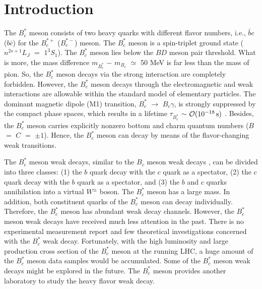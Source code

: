 \documentclass[preprint,superscriptaddress,nofootinbib]{revtex4}
\begin{document}
  \section{Introduction}
  \label{sec01}
  The $B_{c}^{\ast}$ meson consists of two heavy quarks with
  different flavor numbers, i.e., $\bar{b}c$ ($b\bar{c}$) for the
  $B_{c}^{{\ast}+}$ ($B_{c}^{{\ast}-}$) meson.
  The $B_{c}^{\ast}$ meson is a spin-triplet ground state
  ($n^{2s+1}L_{J}$ $=$ $1^{3}S_{1}$).
  The $B_{c}^{\ast}$ meson lies below the $BD$ meson pair
  threshold. What is more, the mass difference $m_{B_{c}^{\ast}}$ $-$
  $m_{B_{c}}$ ${\simeq}$ 50 MeV \cite{prd86.094510} is far less
  than the mass of pion.
  So, the $B_{c}^{\ast}$ meson decays via the strong interaction are
  completely forbidden.
  However, the $B_{c}^{\ast}$ meson decays through the
  electromagnetic and weak interactions are allowable within the
  standard model of elementary particles.
  The dominant magnetic dipole (M1) transition,
  $B_{c}^{\ast}$ ${\to}$ $B_{c}{\gamma}$, is strongly suppressed by
  the compact phase spaces, which results in a lifetime
  ${\tau}_{B_{c}^{\ast}}$ ${\sim}$ ${\cal O}(10^{-18}\,{\rm s})$
  \cite{epja52.90}.
  Besides, the $B_{c}^{\ast}$ meson carries explicitly nonzero
  bottom and charm quantum numbers ($B$ $=$ $C$ $=$ ${\pm}1$).
  Hence, the $B_{c}^{\ast}$ meson can decay by means of the
  flavor-changing weak transitions.

  The $B_{c}^{\ast}$ meson weak decays, similar to the $B_{c}$
  meson weak decays \cite{qwg,zpc51,prd49,usp38,epjc60.107,prd77.074013,prd89.114019},
  can be divided into three classes:
  (1) the $b$ quark decay with the $c$ quark as a spectator,
  (2) the $c$ quark decay with the $b$ quark as a spectator,
  and (3) the $b$ and $c$ quarks annihilation into a virtual
  $W^{\pm}$ boson.
  The $B_{c}^{\ast}$ meson has a large mass. In addition,
  both constituent quarks of the $B_{c}^{\ast}$ meson can decay
  individually. Therefore, the $B_{c}^{\ast}$ meson has abundant
  weak decay channels.
  However, the $B_{c}^{\ast}$ meson weak decays have received much
  less attention in the past.
  There is no experimental measurement report \cite{pdg} and few
  theoretical investigations concerned with the $B_{c}^{\ast}$ weak decay.
  Fortunately, with the high luminosity and large production
  cross section of the $B_{c}^{\ast}$ meson \cite{plb364,prd54.4344,epjc38.267,prd72.114009}
  at the running LHC, a huge amount of the $B_{c}^{\ast}$ meson
  data samples would be accumulated. Some of the $B_{c}^{\ast}$
  meson weak decays might be explored in the future.
  The $B_{c}^{\ast}$ meson provides another laboratory to
  study the heavy flavor weak decay.
\end{document}
